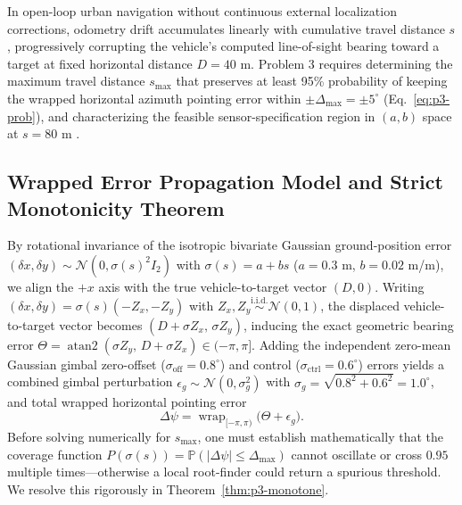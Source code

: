 In open-loop urban navigation without continuous external localization corrections, odometry drift accumulates linearly with cumulative travel distance $s$, progressively corrupting the vehicle's computed line-of-sight bearing toward a target at fixed horizontal distance $D=40$ m. Problem 3 requires determining the maximum travel distance $s_{\max}$ that preserves at least 95\% probability of keeping the wrapped horizontal azimuth pointing error within $\pm\Delta_{\max}=\pm 5^\circ$ (Eq.~\eqref{eq:p3-prob}), and characterizing the feasible sensor-specification region in $(a,b)$ space at $s=80$ m \cite{jcgm2008}.

\subsection{Wrapped Error Propagation Model and Strict Monotonicity Theorem}
By rotational invariance of the isotropic bivariate Gaussian ground-position error $(\delta x,\delta y)\sim\mathcal{N}(0,\sigma(s)^2 I_2)$ with $\sigma(s)=a+bs$ ($a=0.3$ m, $b=0.02$ m/m), we align the $+x$ axis with the true vehicle-to-target vector $(D,0)$. Writing $(\delta x,\delta y)=\sigma(s)(-Z_x,-Z_y)$ with $Z_x,Z_y\stackrel{\mathrm{i.i.d.}}{\sim}\mathcal{N}(0,1)$, the displaced vehicle-to-target vector becomes $(D+\sigma Z_x,\,\sigma Z_y)$, inducing the exact geometric bearing error $\Theta=\operatorname{atan2}(\sigma Z_y,\,D+\sigma Z_x)\in(-\pi,\pi]$. Adding the independent zero-mean Gaussian gimbal zero-offset ($\sigma_{\mathrm{off}}=0.8^\circ$) and control ($\sigma_{\mathrm{ctrl}}=0.6^\circ$) errors yields a combined gimbal perturbation $\epsilon_g\sim\mathcal{N}(0,\sigma_g^2)$ with $\sigma_g=\sqrt{0.8^2+0.6^2}=1.0^\circ$, and total wrapped horizontal pointing error
\[
\Delta\psi = \operatorname{wrap}_{[-\pi,\pi)}\!\bigl(\Theta + \epsilon_g\bigr).
\]
Before solving numerically for $s_{\max}$, one must establish mathematically that the coverage function $P(\sigma(s))=\mathbb{P}(|\Delta\psi|\le\Delta_{\max})$ cannot oscillate or cross $0.95$ multiple times—otherwise a local root-finder could return a spurious threshold. We resolve this rigorously in Theorem~\ref{thm:p3-monotone}.

